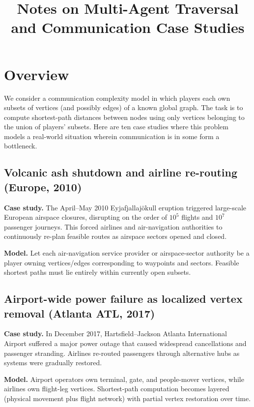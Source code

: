\documentclass[11pt]{article}
\title{Notes on Multi-Agent Traversal and Communication Case Studies}
\author{}
\date{}
\begin{document}
\maketitle

\section{Overview}
We consider a communication complexity model in which players each own subsets of vertices (and possibly edges) of a known global graph. The task is to compute shortest-path distances between nodes using only vertices belonging to the union of players' subsets. Here are ten case studies where this problem models a real-world situation wherein communication is in some form a bottleneck.

\subsection{Volcanic ash shutdown and airline re-routing (Europe, 2010)}

\textbf{Case study.} The April--May 2010 Eyjafjallaj\"okull eruption triggered large-scale European airspace closures, disrupting on the order of $10^5$ flights and $10^7$ passenger journeys. This forced airlines and air-navigation authorities to continuously re-plan feasible routes as airspace sectors opened and closed. \parencite{eurocontrol2010ash}

\textbf{Model.} Let each air-navigation service provider or airspace-sector authority be a player owning vertices/edges corresponding to waypoints and sectors. Feasible shortest paths must lie entirely within currently open subsets.

\subsection{Airport-wide power failure as localized vertex removal (Atlanta ATL, 2017)}
\textbf{Case study.} In December 2017, Hartsfield--Jackson Atlanta International Airport suffered a major power outage that caused widespread cancellations and passenger stranding. Airlines re-routed passengers through alternative hubs as systems were gradually restored. \parencite{cntraveler2017atl}

\textbf{Model.} Airport operators own terminal, gate, and people-mover vertices, while airlines own flight-leg vertices. Shortest-path computation becomes layered (physical movement plus flight network) with partial vertex restoration over time.
\end{document}
